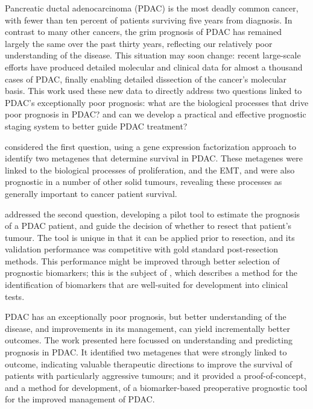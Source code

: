 Pancreatic ductal adenocarcinoma (PDAC) is the most deadly common cancer, with fewer than ten percent of patients surviving five years from diagnosis.  In contrast to many other cancers, the grim prognosis of PDAC has remained largely the same over the past thirty years, reflecting our relatively poor understanding of the disease.  This situation may soon change: recent large-scale efforts have produced detailed molecular and clinical data for almost a thousand cases of PDAC, finally enabling detailed dissection of the cancer's molecular basis.  This work used these new data to directly address two questions linked to PDAC's exceptionally poor prognosis: what are the biological processes that drive poor prognosis in PDAC? and can we develop a practical and effective prognostic staging system to better guide PDAC treatment?
\par
{} considered the first question, using a gene expression factorization approach to identify two metagenes that determine survival in PDAC.  These metagenes were linked to the biological processes of proliferation, and the EMT, and were also prognostic in a number of other solid tumours, revealing these processes as generally important to cancer patient survival.  
\par
{} addressed the second question, developing a pilot tool to estimate the prognosis of a PDAC patient, and guide the decision of whether to resect that patient's tumour.  The tool is unique in that it can be applied prior to resection, and its validation performance was competitive with gold standard post-resection methods.  This performance might be improved through better selection of prognostic biomarkers; this is the subject of , which describes a method for the identification of biomarkers that are well-suited for development into clinical tests.
\par
PDAC has an exceptionally poor prognosis, but better understanding of the disease, and improvements in its management, can yield incrementally better outcomes.  The work presented here focussed on understanding and predicting prognosis in PDAC.  It identified two metagenes that were strongly linked to outcome, indicating valuable therapeutic directions to improve the survival of patients with particularly aggressive tumours; and it provided a proof-of-concept, and a method for development, of a biomarker-based preoperative prognostic tool for the improved management of PDAC.

